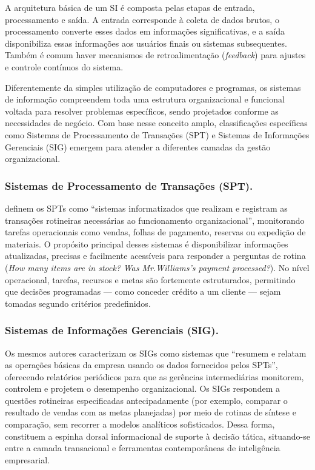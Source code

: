 \documentclass[portuguese]{sbc2025}%
\begin{document}
A arquitetura básica de um SI é composta pelas etapas de entrada, processamento e saída. A entrada corresponde à coleta de dados brutos, o processamento converte esses dados em informações significativas, e a saída disponibiliza essas informações aos usuários finais ou sistemas subsequentes. Também é comum haver mecanismos de retroalimentação (\textit{feedback}) para ajustes e controle contínuos do sistema.

Diferentemente da simples utilização de computadores e programas, os sistemas de informação compreendem toda uma estrutura organizacional e funcional voltada para resolver problemas específicos, sendo projetados conforme as necessidades de negócio. Com base nesse conceito amplo, classificações específicas como Sistemas de Processamento de Transações (SPT) e Sistemas de Informações Gerenciais (SIG) emergem para atender a diferentes camadas da gestão organizacional.

\subsubsection{Sistemas de Processamento de Transações (SPT).} 
\cite{Laudon_Laudon_2011} definem os SPTs como “sistemas informatizados que realizam e registram as transações rotineiras necessárias ao funcionamento organizacional”, monitorando tarefas operacionais como vendas, folhas de pagamento, reservas ou expedição de materiais. O propósito principal desses sistemas é disponibilizar informações atualizadas, precisas e facilmente acessíveis para responder a perguntas de rotina (\textit{How many items are in stock?} 	\textit{Was Mr.Williams’s payment processed?}). No nível operacional, tarefas, recursos e metas são fortemente estruturados, permitindo que decisões programadas — como conceder crédito a um cliente — sejam tomadas segundo critérios predefinidos.

\subsubsection{Sistemas de Informações Gerenciais (SIG).}
Os mesmos autores caracterizam os SIGs como sistemas que “resumem e relatam as operações básicas da empresa usando os dados fornecidos pelos SPTs”, oferecendo relatórios periódicos para que as gerências intermediárias monitorem, controlem e projetem o desempenho organizacional. Os SIGs respondem a questões rotineiras especificadas antecipadamente (por exemplo, comparar o resultado de vendas com as metas planejadas) por meio de rotinas de síntese e comparação, sem recorrer a modelos analíticos sofisticados. Dessa forma, constituem a espinha dorsal informacional de suporte à decisão tática, situando-se entre a camada transacional e ferramentas contemporâneas de inteligência empresarial.
\end{document}
